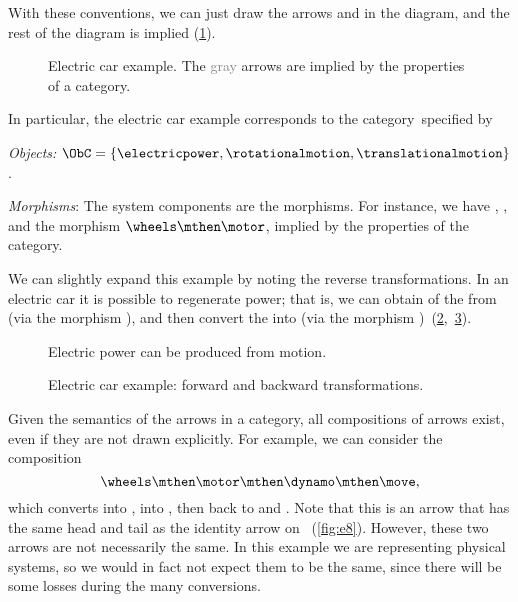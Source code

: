 With these conventions, we can just draw the arrows \motor and \wheels in the diagram, and the rest of the diagram is implied (\cref{fig:e5}).

\begin{figure}[h!]
    \centering
    \caption{
        Electric car example.
        The \textcolor{gray}{gray} arrows are implied by the properties
        of a category.
    }
    \label{fig:e5}
\end{figure}

In particular, the electric car example corresponds to the category~\CatC specified by
\begin{compactitem}
    \item \emph{Objects:} $\ObC=\{ \electricpower,\rotationalmotion,\translationalmotion\}$.
    \item \emph{Morphisms}: The system components are the morphisms.
    For instance, we have \motor, \wheels, and the morphism $\wheels \mthen \motor$, implied by the properties of the category.
\end{compactitem}

We can slightly expand this example by noting the reverse transformations.
In an electric car
it is possible to regenerate power; that is, we can obtain \rotationalmotion of the \wheels from
\translationalmotion (via the morphism \move), and then convert the \rotationalmotion into \electricpower (via the morphism \dynamo)~(\cref{fig:e6},~\cref{fig:e6-together}).

\begin{figure}[h!]
    \centering
    \caption{Electric power can be produced from motion.}
    \label{fig:e6}
\end{figure}

\begin{figure}[h!]
    \centering
    \caption{Electric car example: forward and backward transformations.\label{fig:e6-together}}
\end{figure}
Given the semantics of the arrows in a category, all compositions of arrows exist, even if they are not drawn
explicitly.
For example, we can consider the composition
\begin{equation*}
    \wheels \mthen \motor \mthen \dynamo \mthen \move,
\end{equation*}
which converts \translationalmotion into \rotationalmotion, into \electricpower, then back to
\rotationalmotion and \translationalmotion.
Note that this is an arrow that has the same head and tail as the identity arrow on \translationalmotion~(\cref{fig:e8}).
However, these two arrows are not necessarily the same.
In this example we are representing physical systems, so we would in fact not expect them to be the same, since there will be some losses during the many conversions.

